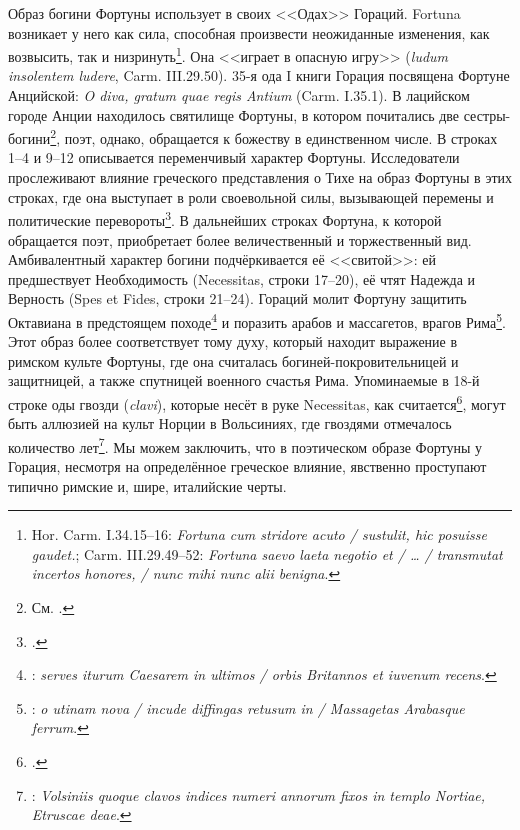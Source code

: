 Образ богини Фортуны использует в своих <<Одах>> Гораций. Fortuna возникает у него как сила, способная произвести неожиданные изменения, как возвысить, так и низринуть\footnote{Hor. Carm. I.34.15--16: \textit{ Fortuna cum stridore acuto / sustulit, hic posuisse gaudet.}; Carm. III.29.49--52: \textit{Fortuna saevo laeta negotio et / \ldots{} / transmutat incertos honores, / nunc mihi nunc alii benigna}.}. Она <<играет в опасную игру>> (\textit{ludum insolentem ludere}, Carm. III.29.50). 35-я ода I книги Горация посвящена Фортуне Анцийской: \textit{O diva, gratum quae regis Antium} (Carm. I.35.1). В лацийском городе Анции находилось святилище Фортуны, в котором почитались две сестры-богини\footnote{См. .}, поэт, однако, обращается к божеству в единственном числе. В строках 1--4 и 9--12 описывается переменчивый характер Фортуны. Исследователи прослеживают влияние греческого представления о Тихе на образ Фортуны в этих строках, где она выступает в роли своевольной силы, вызывающей перемены и политические перевороты\footcite[P. 266]{Arya2002}. В дальнейших строках Фортуна, к которой обращается поэт, приобретает более величественный и торжественный вид. Амбивалентный характер богини подчёркивается её <<свитой>>: ей предшествует Необходимость (Necessitas, строки 17--20), её чтят Надежда и Верность (Spes et Fides, строки 21--24). Гораций молит Фортуну защитить Октавиана в предстоящем походе\footnote{: \textit{serves iturum Caesarem in ultimos / orbis Britannos et iuvenum recens}.} и поразить арабов и массагетов, врагов Рима\footnote{: \textit{o utinam nova / incude diffingas retusum in / Massagetas Arabasque ferrum}.}. Этот образ более соответствует тому духу, который находит выражение в римском культе Фортуны, где она считалась богиней-покровительницей и защитницей, а также спутницей военного счастья Рима. Упоминаемые в 18-й строке оды гвозди (\textit{clavi}), которые несёт в руке Necessitas, как считается\footcite[P. 268]{Arya2002}, могут быть аллюзией на культ Норции в Вольсиниях, где гвоздями отмечалось количество лет\footnote{: \textit{Volsiniis quoque clavos indices numeri annorum fixos in templo Nortiae, Etruscae deae}.}. Мы можем заключить, что в поэтическом образе Фортуны у Горация, несмотря на определённое греческое влияние, явственно проступают типично римские и, шире, италийские черты.



